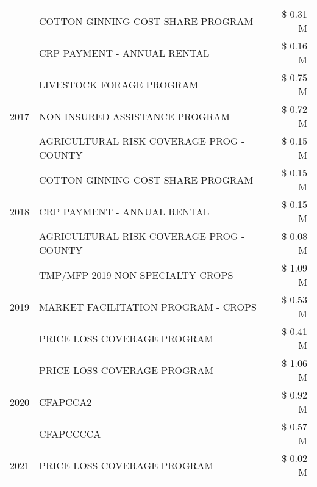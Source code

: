 \begin{tabular}{llr}
 & COTTON GINNING COST SHARE PROGRAM             & \$ 0.31 M \\
 & CRP PAYMENT - ANNUAL RENTAL                   & \$ 0.16 M \\
\cline{1-3}
\multirow[t]{3}{*}{2017} & LIVESTOCK FORAGE PROGRAM & \$ 0.75 M \\
 & NON-INSURED ASSISTANCE PROGRAM & \$ 0.72 M \\
 & AGRICULTURAL RISK COVERAGE PROG - COUNTY & \$ 0.15 M \\
\cline{1-3}
\multirow[t]{3}{*}{2018} & COTTON GINNING COST SHARE PROGRAM & \$ 0.15 M \\
 & CRP PAYMENT - ANNUAL RENTAL & \$ 0.15 M \\
 & AGRICULTURAL RISK COVERAGE PROG - COUNTY & \$ 0.08 M \\
\cline{1-3}
\multirow[t]{3}{*}{2019} & TMP/MFP 2019 NON SPECIALTY CROPS & \$ 1.09 M \\
 & MARKET FACILITATION PROGRAM - CROPS & \$ 0.53 M \\
 & PRICE LOSS COVERAGE PROGRAM & \$ 0.41 M \\
\cline{1-3}
\multirow[t]{3}{*}{2020} & PRICE LOSS COVERAGE PROGRAM & \$ 1.06 M \\
 & CFAPCCA2 & \$ 0.92 M \\
 & CFAPCCCCA & \$ 0.57 M \\
\cline{1-3}
2021 & PRICE LOSS COVERAGE PROGRAM & \$ 0.02 M \\
\cline{1-3}
\bottomrule
\end{tabular}
